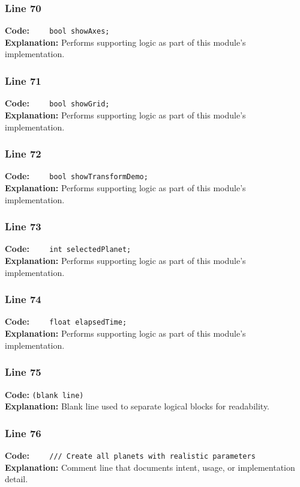 \documentclass[11pt,a4paper]{article}
\begin{document}
\subsubsection*{Line 70}
\textbf{Code:} \verb|    bool showAxes;|\\
\textbf{Explanation:} Performs supporting logic as part of this module's implementation.

\subsubsection*{Line 71}
\textbf{Code:} \verb|    bool showGrid;|\\
\textbf{Explanation:} Performs supporting logic as part of this module's implementation.

\subsubsection*{Line 72}
\textbf{Code:} \verb|    bool showTransformDemo;|\\
\textbf{Explanation:} Performs supporting logic as part of this module's implementation.

\subsubsection*{Line 73}
\textbf{Code:} \verb|    int selectedPlanet;|\\
\textbf{Explanation:} Performs supporting logic as part of this module's implementation.

\subsubsection*{Line 74}
\textbf{Code:} \verb|    float elapsedTime;|\\
\textbf{Explanation:} Performs supporting logic as part of this module's implementation.

\subsubsection*{Line 75}
\textbf{Code:} \texttt{(blank line)}\\
\textbf{Explanation:} Blank line used to separate logical blocks for readability.

\subsubsection*{Line 76}
\textbf{Code:} \verb|    /// Create all planets with realistic parameters|\\
\textbf{Explanation:} Comment line that documents intent, usage, or implementation detail.
\end{document}
